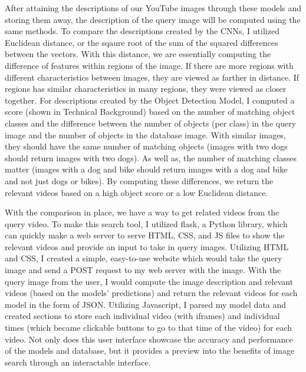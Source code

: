\documentclass[10pt,twocolumn]{article}
\begin{document}
After attaining the descriptions of our YouTube images through these models and storing them away, the description of the query image will be computed using the same methods. To compare the descriptions created by the CNNs, I utilized Euclidean distance, or the sqaure root of the sum of the squared differences between the vectors. With this distance, we are essentially computing the difference of features within regions of the image. If there are more regions with different characteristics between images, they are viewed as farther in distance. If regions has similar characteristics in many regions, they were viewed as closer together. For descriptions created by the Object Detection Model, I computed a score (shown in Technical Background) based on the number of matching object classes and the difference between the number of objects (per class) in the query image and the number of objects in the database image. With similar images, they should have the same number of matching objects (images with two dogs should return images with two dogs). As well as, the number of matching classes matter (images with a dog and bike should return images with a dog and bike and not just dogs or bikes). By computing these differences, we return the relevant videos based on a high object score or a low Euclidean distance. 



With the comparison in place, we have a way to get related videos from the query video. To make this search tool, I utilized flask, a Python library, which can quickly make a web server to serve HTML, CSS, and JS files to show the relevant videos and provide an input to take in query images. Utilizing HTML and CSS, I created a simple, easy-to-use website which would take the query image and send a POST request to my web server with the image. With the query image from the user, I would compute the image description and relevant videos (based on the models' predictions) and return the relevant videos for each model in the form of JSON. Utilizing Javascript, I parsed my model data and created sections to store each individual video (with iframes) and individual times (which became clickable buttons to go to that time of the video) for each video. Not only does this user interface showcase the accuracy and performance of the models and database, but it provides a preview into the benefits of image search through an interactable interface.
\end{document}
